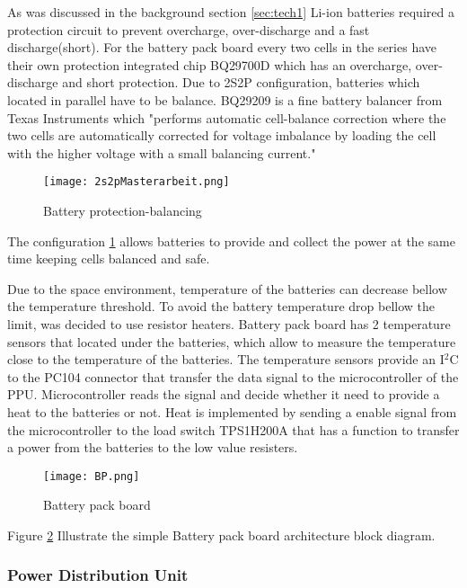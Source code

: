   As was discussed in the background section \ref{sec:tech1} Li-ion batteries required a protection circuit to prevent overcharge, over-discharge and a fast discharge(short). For the battery pack board every two cells in the series have their own protection integrated chip BQ29700D which has an overcharge, over-discharge and short protection. Due to 2S2P configuration, batteries which located in parallel have to be balance. BQ29209 is a fine battery balancer from Texas Instruments which \cite{23}"performs automatic cell-balance correction where the two cells are automatically corrected for voltage imbalance by loading the cell with the higher voltage with a small balancing current."  
  
  \begin{figure}[h]
  	\centering
  	\texttt{[image: 2s2pMasterarbeit.png]}
  	\caption{Battery protection-balancing}
  	\label{fig: Bat_prot_bal}
  \end{figure}
  
  The configuration \ref{fig: Bat_prot_bal} allows batteries to provide and collect the power at the same time keeping cells balanced and safe.
  
  Due to the space environment, temperature of the batteries can decrease bellow the temperature threshold. To avoid the battery temperature drop bellow the limit, was decided to use resistor heaters. Battery pack board has 2 temperature sensors that located under the batteries, which allow to measure the temperature close to the temperature of the batteries. The temperature sensors provide an I$^{2}$C to the PC104 connector that transfer the data signal to the microcontroller of the PPU. Microcontroller reads the signal and decide whether it need to provide a heat to the batteries or not. Heat is implemented by sending a enable signal from the microcontroller to the load switch TPS1H200A that has a function to transfer a power from the batteries to the low value resisters.  
  
  
  \begin{figure}[h]
  	\centering
  	\texttt{[image: BP.png]}
  	\caption{Battery pack board}
  	\label{fig: BP}
  \end{figure}
  
   Figure \ref{fig: BP} Illustrate the simple Battery pack board architecture block diagram. 
  
  \subsubsection{Power Distribution Unit}
  
